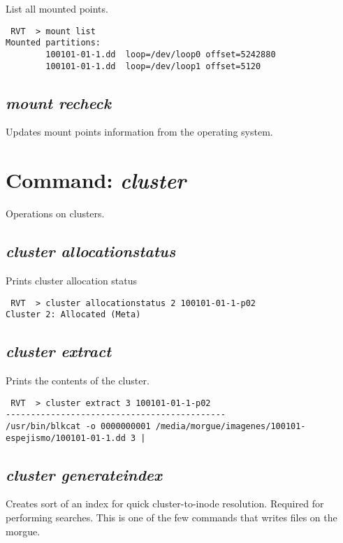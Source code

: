 \documentclass[a4paper,11pt,oneside]{report}
\begin{document}
List all mounted points.

\begin{verbatim}
 RVT  > mount list
Mounted partitions: 
        100101-01-1.dd  loop=/dev/loop0 offset=5242880
        100101-01-1.dd  loop=/dev/loop1 offset=5120
\end{verbatim}


\subsection{\emph{mount recheck}}

Updates mount points information from the operating system.



\section{Command: \emph{cluster}}

Operations on clusters.

\subsection{\emph{cluster allocationstatus}}

Prints cluster allocation status

\begin{verbatim}
 RVT  > cluster allocationstatus 2 100101-01-1-p02
Cluster 2: Allocated (Meta)
\end{verbatim}


\subsection{\emph{cluster extract}}

Prints the contents of the cluster.

\begin{verbatim}
 RVT  > cluster extract 3 100101-01-1-p02                                     
--------------------------------------------
/usr/bin/blkcat -o 0000000001 /media/morgue/imagenes/100101-espejismo/100101-01-1.dd 3 | 
\end{verbatim}


\subsection{\emph{cluster generateindex}}

Creates sort of an index for quick cluster-to-inode resolution. Required for performing searches. This is one of the few commands that writes files on the morgue.
\end{document}

